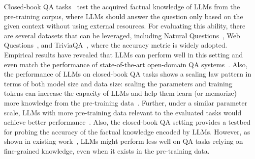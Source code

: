Closed-book QA tasks~\cite{Roberts-EMNLP-2020-How} test the acquired factual knowledge of LLMs from the pre-training corpus, where LLMs should answer the question only based on the given context without using external resources. 
For evaluating this ability, there are  several datasets that can be leveraged, including  Natural Questions~\cite{Kwiatkowski-ACL-2019-Natural}, Web Questions~\cite{Berant-EMNLP-2013-Semantic}, and TriviaQA~\cite{Joshi-ACL-2017-TriviaQA}, %
{where the accuracy metric is widely adopted.}
Empirical results have revealed that  %
LLMs can perform well in this setting and even match the performance of state-of-the-art {open-domain} QA systems~\cite{Chowdhery-arxiv-2022-PaLM}.
Also, the performance of LLMs on closed-book QA tasks shows a scaling law pattern in terms of both model size and data size: 
scaling the parameters and training tokens can increase the capacity of LLMs and help them learn (or memorize) more knowledge from the pre-training data~\cite{Chowdhery-arxiv-2022-PaLM}. 
Further, under a similar parameter scale, LLMs with more pre-training data relevant to the evaluated tasks would achieve better performance~\cite{Nakano-arxiv-2021-WebGPT}. 
Also, the closed-book QA setting  provides a testbed for probing the accuracy of the factual knowledge encoded by LLMs. 
{However, as shown in existing work~\cite{Brown-NeurIPS-2020-Language}, LLMs might perform less well on QA tasks relying on fine-grained knowledge, even when it exists in the pre-training data.}







